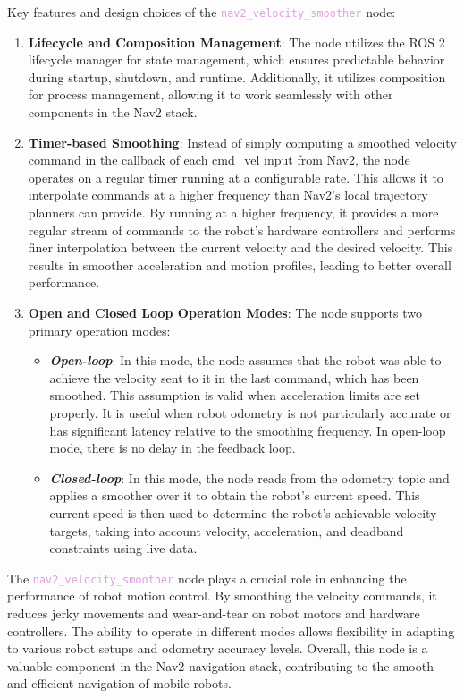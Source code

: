 Key features and design choices of the \textcolor{Plum}{\texttt{nav2\_velocity\_smoother}} node:
\begin{enumerate}
    \item \textbf{Lifecycle and Composition Management}: The node utilizes the ROS 2 lifecycle manager for state management, which ensures predictable behavior during startup, shutdown, and runtime. Additionally, it utilizes composition for process management, allowing it to work seamlessly with other components in the Nav2 stack.

    \item \textbf{Timer-based Smoothing}: Instead of simply computing a smoothed velocity command in the callback of each cmd\_vel input from Nav2, the node operates on a regular timer running at a configurable rate. This allows it to interpolate commands at a higher frequency than Nav2's local trajectory planners can provide. By running at a higher frequency, it provides a more regular stream of commands to the robot's hardware controllers and performs finer interpolation between the current velocity and the desired velocity. This results in smoother acceleration and motion profiles, leading to better overall performance.

    \item \textbf{Open and Closed Loop Operation Modes}: The node supports two primary operation modes:
    \begin{itemize}
        \item \textbf{\textit{Open-loop}}: In this mode, the node assumes that the robot was able to achieve the velocity sent to it in the last command, which has been smoothed. This assumption is valid when acceleration limits are set properly. It is useful when robot odometry is not particularly accurate or has significant latency relative to the smoothing frequency. In open-loop mode, there is no delay in the feedback loop.
        \item \textbf{\textit{Closed-loop}}: In this mode, the node reads from the odometry topic and applies a smoother over it to obtain the robot's current speed. This current speed is then used to determine the robot's achievable velocity targets, taking into account velocity, acceleration, and deadband constraints using live data.
    \end{itemize}    
\end{enumerate}

The \textcolor{Plum}{\texttt{nav2\_velocity\_smoother}} node plays a crucial role in enhancing the performance of robot motion control. By smoothing the velocity commands, it reduces jerky movements and wear-and-tear on robot motors and hardware controllers. The ability to operate in different modes allows flexibility in adapting to various robot setups and odometry accuracy levels. Overall, this node is a valuable component in the Nav2 navigation stack, contributing to the smooth and efficient navigation of mobile robots.

